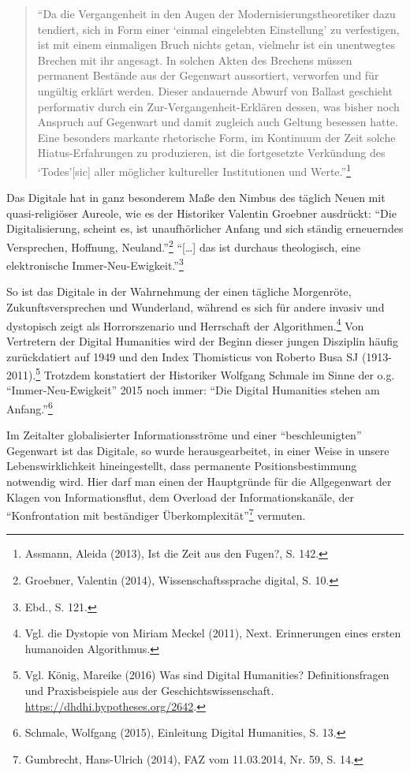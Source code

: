 \documentclass[a4paper,
fontsize=11pt,
oneside,
numbers=noperiodatend,
parskip=half-,
bibliography=totoc,
final
]{scrartcl}
\begin{document}
\begin{quote}
\enquote{Da die Vergangenheit in den Augen der
Modernisierungstheoretiker dazu tendiert, sich in Form einer
\enquote{einmal eingelebten Einstellung} zu verfestigen, ist mit einem
einmaligen Bruch nichts getan, vielmehr ist ein unentwegtes Brechen mit
ihr angesagt. In solchen Akten des Brechens müssen permanent Bestände
aus der Gegenwart aussortiert, verworfen und für ungültig erklärt
werden. Dieser andauernde Abwurf von Ballast geschieht performativ durch
ein Zur-Vergangenheit-Erklären dessen, was bisher noch Anspruch auf
Gegenwart und damit zugleich auch Geltung besessen hatte. Eine besonders
markante rhetorische Form, im Kontinuum der Zeit solche
Hiatus-Erfahrungen zu produzieren, ist die fortgesetzte Verkündung des
\enquote{Todes}{[}sic{]} aller möglicher kultureller Institutionen und
Werte.}\footnote{Assmann, Aleida (2013), Ist die Zeit aus den Fugen?, S.
  142.}
\end{quote}

Das Digitale hat in ganz besonderem Maße den Nimbus des täglich Neuen
mit quasi-religiöser Aureole, wie es der Historiker Valentin Groebner
ausdrückt: \enquote{Die Digitalisierung, scheint es, ist unaufhörlicher
Anfang und sich ständig erneuerndes Versprechen, Hoffnung,
Neuland.}\footnote{Groebner, Valentin (2014), Wissenschaftssprache
  digital, S. 10.} \enquote{{[}\ldots{}{]} das ist durchaus theologisch,
eine elektronische Immer-Neu-Ewigkeit.}\footnote{Ebd., S. 121.}

So ist das Digitale in der Wahrnehmung der einen tägliche Morgenröte,
Zukunftsversprechen und Wunderland, während es sich für andere invasiv
und dystopisch zeigt als Horrorszenario und Herrschaft der
Algorithmen.\footnote{Vgl. die Dystopie von Miriam Meckel (2011), Next.
  Erinnerungen eines ersten humanoiden Algorithmus.} Von Vertretern der
Digital Humanities wird der Beginn dieser jungen Disziplin häufig
zurückdatiert auf 1949 und den Index Thomisticus von Roberto Busa SJ
(1913-2011).\footnote{Vgl. König, Mareike (2016) Was sind Digital
  Humanities? Definitionsfragen und Praxisbeispiele aus der
  Geschichtswissenschaft. \url{https://dhdhi.hypotheses.org/2642}.}
Trotzdem konstatiert der Historiker Wolfgang Schmale im Sinne der o.g.
\enquote{Immer-Neu-Ewigkeit} 2015 noch immer: \enquote{Die Digital
Humanities stehen am Anfang.}\footnote{Schmale, Wolfgang (2015),
  Einleitung Digital Humanities, S. 13.}

Im Zeitalter globalisierter Informationsströme und einer
\enquote{beschleunigten} Gegenwart ist das Digitale, so wurde
herausgearbeitet, in einer Weise in unsere Lebenswirklichkeit
hineingestellt, dass permanente Positionsbestimmung notwendig wird. Hier
darf man einen der Hauptgründe für die Allgegenwart der Klagen von
Informationsflut, dem Overload der Informationskanäle, der
\enquote{Konfrontation mit beständiger Überkomplexität}\footnote{Gumbrecht,
  Hans-Ulrich (2014), FAZ vom 11.03.2014, Nr. 59, S. 14.} vermuten.
\end{document}
